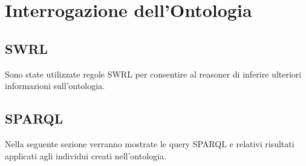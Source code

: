 \chapter{Interrogazione dell'Ontologia}

\section{SWRL}\label{sec:swrl}
Sono state utilizzate regole SWRL per consentire al reasoner di inferire ulteriori informazioni sull'ontologia.

\section{SPARQL}\label{sec:sparql}
Nella seguente sezione verranno mostrate le query SPARQL e relativi risultati applicati agli individui creati nell'ontologia.